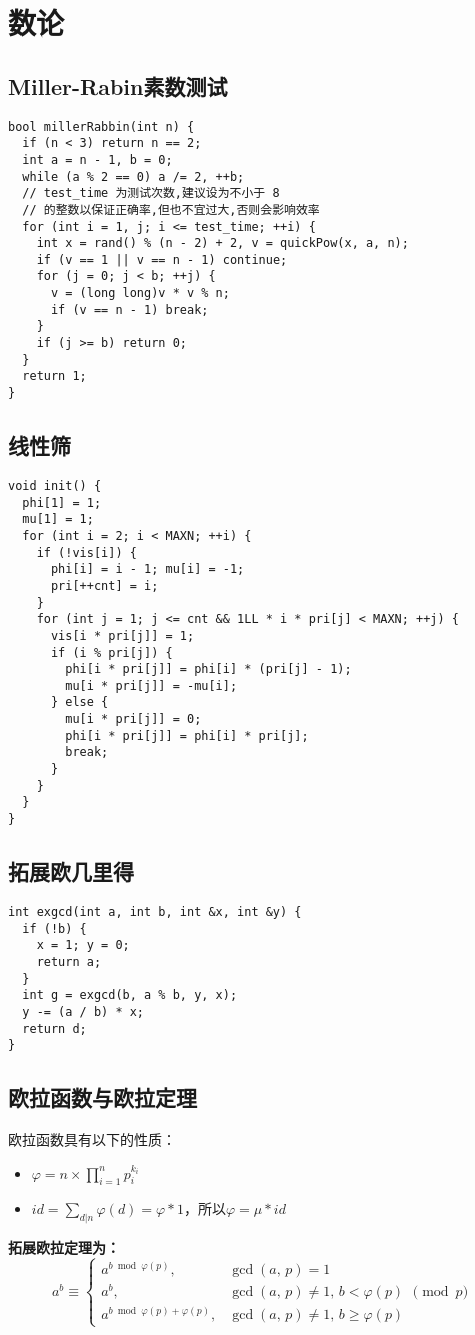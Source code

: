 \section{数论}
\subsection{Miller-Rabin素数测试}
\begin{lstlisting}
bool millerRabbin(int n) {
  if (n < 3) return n == 2;
  int a = n - 1, b = 0;
  while (a % 2 == 0) a /= 2, ++b;
  // test_time 为测试次数,建议设为不小于 8
  // 的整数以保证正确率,但也不宜过大,否则会影响效率
  for (int i = 1, j; i <= test_time; ++i) {
    int x = rand() % (n - 2) + 2, v = quickPow(x, a, n);
    if (v == 1 || v == n - 1) continue;
    for (j = 0; j < b; ++j) {
      v = (long long)v * v % n;
      if (v == n - 1) break;
    }
    if (j >= b) return 0;
  }
  return 1;
}
\end{lstlisting}
\subsection{线性筛}
\begin{lstlisting}
void init() {
  phi[1] = 1;
  mu[1] = 1;
  for (int i = 2; i < MAXN; ++i) {
    if (!vis[i]) {
      phi[i] = i - 1; mu[i] = -1;
      pri[++cnt] = i;
    }
    for (int j = 1; j <= cnt && 1LL * i * pri[j] < MAXN; ++j) {
      vis[i * pri[j]] = 1;
      if (i % pri[j]) {
        phi[i * pri[j]] = phi[i] * (pri[j] - 1);
        mu[i * pri[j]] = -mu[i];
      } else {
        mu[i * pri[j]] = 0;
        phi[i * pri[j]] = phi[i] * pri[j];
        break;
      }
    }
  }
}
\end{lstlisting}
\subsection{拓展欧几里得}
\begin{lstlisting}
int exgcd(int a, int b, int &x, int &y) {
  if (!b) {
    x = 1; y = 0;
    return a;
  }
  int g = exgcd(b, a % b, y, x);
  y -= (a / b) * x;
  return d;
}
\end{lstlisting}
\subsection{欧拉函数与欧拉定理}
欧拉函数具有以下的性质：
\begin{itemize}
  \item $\varphi = n\times\prod_{i=1}^np_i^{k_i}$
  \item $id=\sum_{d|n}\varphi(d)=\varphi*1$，所以$\varphi=\mu*id$
\end{itemize}
\textbf{拓展欧拉定理为：}
\begin{equation*}
  a^b\equiv
  \begin{cases}
  a^{b\bmod\varphi(p)},\,&\gcd(a,\,p)=1\\
  a^b,&\gcd(a,\,p)\ne1,\,b<\varphi(p)\\
  a^{b\bmod\varphi(p)+\varphi(p)},&\gcd(a,\,p)\ne1,\,b\ge\varphi(p)
  \end{cases}
  \pmod p
\end{equation*}
